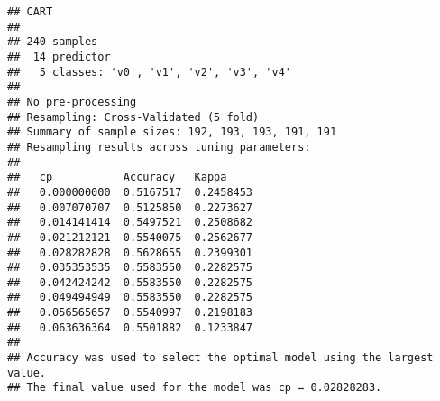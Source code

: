 \documentclass[
]{article}
\begin{document}
\begin{verbatim}
## CART 
## 
## 240 samples
##  14 predictor
##   5 classes: 'v0', 'v1', 'v2', 'v3', 'v4' 
## 
## No pre-processing
## Resampling: Cross-Validated (5 fold) 
## Summary of sample sizes: 192, 193, 193, 191, 191 
## Resampling results across tuning parameters:
## 
##   cp           Accuracy   Kappa    
##   0.000000000  0.5167517  0.2458453
##   0.007070707  0.5125850  0.2273627
##   0.014141414  0.5497521  0.2508682
##   0.021212121  0.5540075  0.2562677
##   0.028282828  0.5628655  0.2399301
##   0.035353535  0.5583550  0.2282575
##   0.042424242  0.5583550  0.2282575
##   0.049494949  0.5583550  0.2282575
##   0.056565657  0.5540997  0.2198183
##   0.063636364  0.5501882  0.1233847
## 
## Accuracy was used to select the optimal model using the largest value.
## The final value used for the model was cp = 0.02828283.
\end{verbatim}
\end{document}
